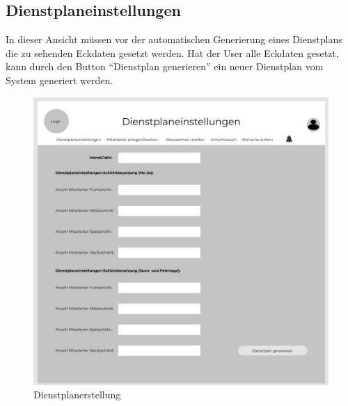 \documentclass[11pt,
paper=a4,
bibtotocnumbered,	  %
liststotocnumbered,  %
DIV=calc,		  %
tablecaptionabove,	  %
headinclude,
]{article}
\begin{document}
\subsection{Dienstplaneinstellungen}
In dieser Ansicht müssen vor der automatischen Generierung eines Dienstplans die zu sehenden Eckdaten gesetzt werden. Hat der User alle Eckdaten gesetzt, kann durch den Button “Dienstplan generieren” ein neuer Dienstplan vom System generiert werden.
\begin{figure}[H]
\includegraphics[width=1\textwidth]{Bilder/Dienstplanerstellung.jpg}
\caption{Dienstplanerstellung}
\end{figure}
\end{document}
